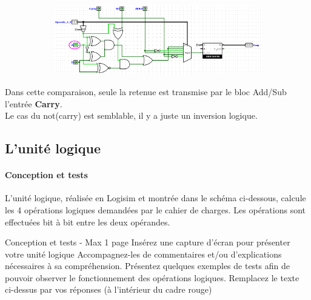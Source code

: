 \documentclass[a4paper]{article}
\begin{document}
\begin{tcolorbox}[colframe=Monokaimagenta,colback=white]
\begin{center}
\begin{figure}[H]
   \begin{subfigure}{.7\textwidth}
        \centering
        \includegraphics[width=.8\linewidth]{src/COMP_TEST_AcarB1.png}
        \label{fig:COMPARATEUR_l_EXEMPLE_1}
   \end{subfigure}


\end{figure}

Dans cette comparaison, seule la retenue est  transmise par le bloc Add/Sub l'entrée \textbf{Carry}.\\
Le cas du not(carry) est semblable, il y a juste un inversion logique.



\end{center}

\end{tcolorbox}

\subsection{L'unité logique}
\label{logique}

\paragraph{Conception et tests}
L’unité logique, réalisée en Logisim et montrée dans le schéma ci-dessous, calcule les 4 opérations logiques demandées par le cahier de charges. Les opérations sont effectuées bit à bit entre les deux opérandes.

\begin{tcolorbox}[colframe=Monokaimagenta,colback=white]
Conception et tests - Max 1 page 
Insérez une capture d’écran pour présenter votre unité logique
Accompagnez-les de commentaires et/ou d’explications nécessaires à sa compréhension.
Présentez quelques exemples de tests  afin de pouvoir observer le fonctionnement des opérations logiques.
Remplacez le texte ci-dessus par vos réponses (à l’intérieur du cadre rouge)\\

\end{tcolorbox}
\end{document}
